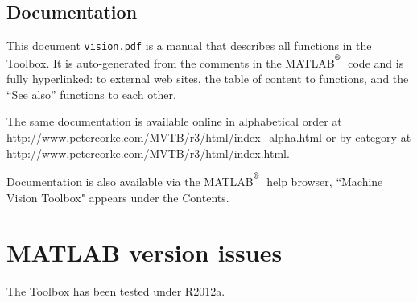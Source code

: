 \documentclass[a4paper]{report}
\def\Mlab{MATLAB$^{\textsuperscript{\textregistered}}$}
\begin{document}
\subsection{Documentation}

This document {\tt vision.pdf} is a manual that describes all functions in the Toolbox.
It is auto-generated from the comments in the \Mlab\ code and is fully hyperlinked:
to external web sites, the table of content to functions, and the ``See also'' functions
to each other.

The same documentation is available online in
alphabetical order at \url{http://www.petercorke.com/MVTB/r3/html/index_alpha.html}
or by category at \url{http://www.petercorke.com/MVTB/r3/html/index.html}.

Documentation is also available via the \Mlab\ help browser, ``Machine
Vision Toolbox" appears under the Contents.

\section{MATLAB version issues}
The Toolbox has been tested under R2012a.
\end{document}
